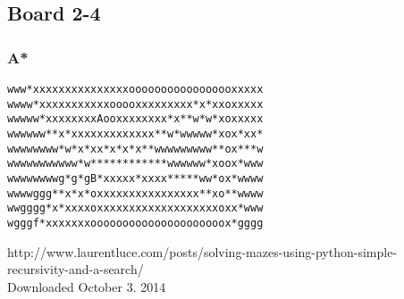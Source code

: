 \documentclass[11pt,a4paper]{article}
\begin{document}
\subsection*{Board 2-4}
\subsubsection*{A*}
\begin{lstlisting}
www*xxxxxxxxxxxxxxxooooooooooooooooxxxxx
wwww*xxxxxxxxxxxooooxxxxxxxxx*x*xxoxxxxx
wwwww*xxxxxxxxAooxxxxxxxx*x**w*w*xoxxxxx
wwwwww**x*xxxxxxxxxxxxx**w*wwwww*xox*xx*
wwwwwwww*w*x*xx*x*x*x**wwwwwwwww**ox***w
wwwwwwwwwww*w************wwwwww*xoox*www
wwwwwwwwg*g*gB*xxxxx*xxxx*****ww*ox*wwww
wwwwggg**x*x*oxxxxxxxxxxxxxxxx**xo**wwww
wwgggg*x*xxxxoxxxxxxxxxxxxxxxxxxxoxx*www
wgggf*xxxxxxxooooooooooooooooooooox*gggg
\end{lstlisting}

\begin{thebibliography}{9}

  http://www.laurentluce.com/posts/solving-mazes-using-python-simple-recursivity-and-a-search/
  \\ Downloaded October 3. 2014

\end{thebibliography}
\end{document}
